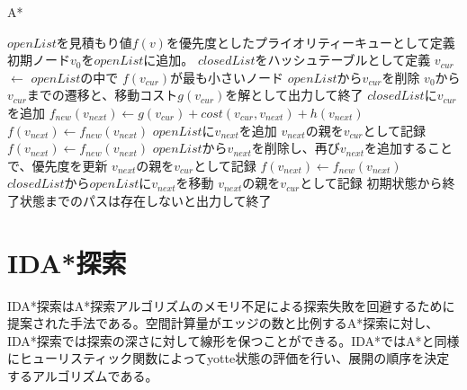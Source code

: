 \documentclass[a4paper,11pt,oneside,openany]{jsbook}
\begin{document}
\newpage
\begin{algorithm}
\caption{A*}
\label{alg:pbnf}
\begin{algorithmic}[1]
\State $openList$を見積もり値$f(v)$を優先度としたプライオリティーキューとして定義
\State 初期ノード$v_0$を$openList$に追加。
\State $closedList$をハッシュテーブルとして定義
    \State $v_{cur}$ $\leftarrow$ $openList$の中で $f(v_{cur})$が最も小さいノード
    \State $openList$から$v_{cur}$を削除
        \State $v_0$から$v_{cur}$までの遷移と、移動コスト$g(v_{cur})$を解として出力して終了
    \EndIf
    \State $closedList$に$v_{cur}$を追加
        \State $f_{new}(v_{next}) \leftarrow g(v_{cur}) + cost(v_{cur}, v_{next}) + h(v_{next})$
            \State $f(v_{next}) \leftarrow f_{new}(v_{next})$ 
            \State $openList$に$v_{next}$を追加
            \State $v_{next}$の親を$v_{cur}$として記録
        \EndIf
            \State $f(v_{next}) \leftarrow f_{new}(v_{next})$
            \State $openList$から$v_{next}$を削除し、再び$v_{next}$を追加することで、優先度を更新
            \State $v_{next}$の親を$v_{cur}$として記録
        \EndIf
            \State $f(v_{next}) \leftarrow f_{new}(v_{next})$
            \State $closedList$から$openList$に$v_{next}$を移動
            \State $v_{next}$の親を$v_{cur}$として記録
        \EndIf
    \EndFor
\EndWhile
\State 初期状態から終了状態までのパスは存在しないと出力して終了
\end{algorithmic}
\end{algorithm}
\newpage

\section{IDA*探索}
IDA*探索\cite{Korf 1985}はA*探索アルゴリズムのメモリ不足による探索失敗を回避するために提案された手法である。空間計算量がエッジの数と比例するA*探索に対し、IDA*探索では探索の深さに対して線形を保つことができる。IDA*ではA*と同様にヒューリスティック関数によってyotte状態の評価を行い、展開の順序を決定するアルゴリズムである。
\end{document}
